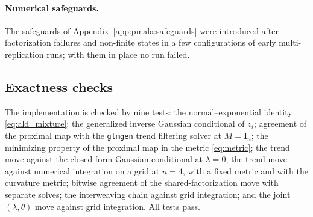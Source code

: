 \paragraph{Numerical safeguards.} The safeguards of Appendix~\ref{app:pmala:safeguards} were introduced after factorization failures and non-finite states in a few configurations of early multi-replication runs; with them in place no run failed.

\subsection{Exactness checks}
\label{app:pmala:tests}

The implementation is checked by nine tests: the normal--exponential identity \eqref{eq:ald_mixture}; the generalized inverse Gaussian conditional of $z_i$; agreement of the proximal map with the \texttt{glmgen} trend filtering solver \citep{tibshirani2014adaptive} at $M = \mathbf{I}_n$; the minimizing property of the proximal map in the metric \eqref{eq:metric}; the trend move against the closed-form Gaussian conditional at $\lambda = 0$; the trend move against numerical integration on a grid at $n = 4$, with a fixed metric and with the curvature metric; bitwise agreement of the shared-factorization move with separate solves; the interweaving chain against grid integration; and the joint $(\lambda,\theta)$ move against grid integration. All tests pass.
